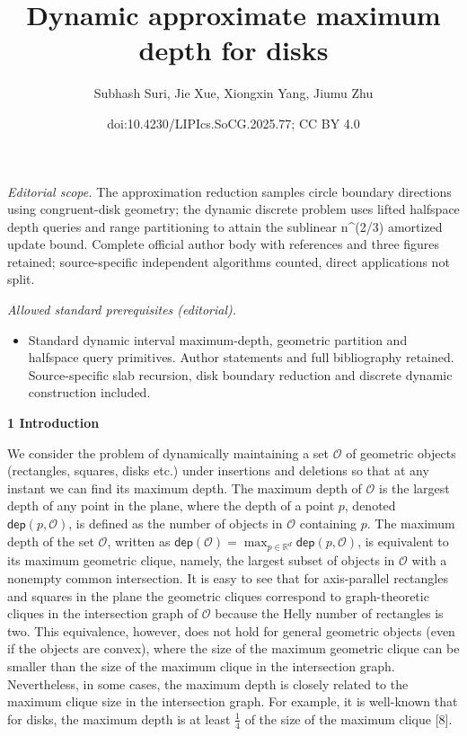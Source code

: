\documentclass[10pt,a4paper]{article}
\title{Dynamic approximate maximum depth for disks}
\author{Subhash Suri, Jie Xue, Xiongxin Yang, Jiumu Zhu}
\date{doi:10.4230/LIPIcs.SoCG.2025.77; CC BY 4.0}
\begin{document}
\maketitle
\noindent\textit{Editorial scope.} The approximation reduction samples circle boundary directions using congruent-disk geometry; the dynamic discrete problem uses lifted halfspace depth queries and range partitioning to attain the sublinear n\textasciicircum{}(2/3) amortized update bound. Complete official author body with references and three figures retained; source-specific independent algorithms counted, direct applications not split.\par\medskip
\noindent\textit{Allowed standard prerequisites (editorial).}\begin{itemize}
\item Standard dynamic interval maximum-depth, geometric partition and halfspace query primitives. Author statements and full bibliography retained. Source-specific slab recursion, disk boundary reduction and discrete dynamic construction included.
\end{itemize}\medskip
\par\medskip\noindent\textbf{1 Introduction}\par
We consider the problem of dynamically maintaining a set $\mathcal{O}$ of geometric objects (rectangles, squares, disks etc.) under insertions and deletions so that at any instant we can find its maximum depth. The maximum depth of $\mathcal{O}$ is the largest depth of any point in the plane, where the depth of a point $p$, denoted ${\mathsf{dep}}(p,\mathcal{O})$, is defined as the number of objects in $\mathcal{O}$ containing $p$. The maximum depth of the set $\mathcal{O}$, written as ${\mathsf{dep}}(\mathcal{O})=\max_{p\in\mathbb{R}^{d}}{\mathsf{dep}}(p,\mathcal%
{O})$, is equivalent to its maximum geometric clique, namely, the largest subset of objects in $\mathcal{O}$ with a nonempty common intersection. It is easy to see that for axis-parallel rectangles and squares in the plane the geometric cliques correspond to graph-theoretic cliques in the intersection graph of $\mathcal{O}$ because the Helly number of rectangles is two. This equivalence, however, does not hold for general geometric objects (even if the objects are convex), where the size of the maximum geometric clique can be smaller than the size of the maximum clique in the intersection graph. Nevertheless, in some cases, the maximum depth is closely related to the maximum clique size in the intersection graph. For example, it is well-known that for disks, the maximum depth is at least $\frac{1}{4}$ of the size of the maximum clique [8].
\end{document}
